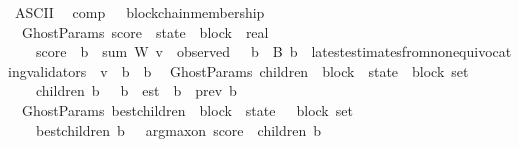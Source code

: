 \begin{isabellebody}
\isanewline
{}\isamarkupfalse%
\ {\isacharparenleft}ASCII{\isacharparenright}\isanewline
\ \ comp\ \ {\isacharparenleft}\ {\isachardoublequoteopen}blockchain{\isacharunderscore}membership{\isachardoublequoteclose}\ {}{}{\isacharparenright}\isanewline
\isanewline
\isanewline
{}\isamarkupfalse%
\ {\isacharparenleft}\ GhostParams{\isacharparenright}\ score\ {\isacharcolon}{\isacharcolon}\ {\isachardoublequoteopen}state\ {\isasymRightarrow}\ block\ {\isasymRightarrow}\ real{\isachardoublequoteclose}\isanewline
\ \ \isanewline
\ \ \ \ {\isachardoublequoteopen}score\ {\isasymsigma}\ b\ {\isacharequal}\ sum\ W\ {\isacharbraceleft}v\ {\isasymin}\ observed\ {\isasymsigma}{\isachardot}\ {\isasymexists}\ b{\isacharprime}\ {\isasymin}\ B{\isachardot}\ b{\isacharprime}\ {\isasymin}\ {\isacharparenleft}latest{\isacharunderscore}estimates{\isacharunderscore}from{\isacharunderscore}non{\isacharunderscore}equivocating{\isacharunderscore}validators\ {\isasymsigma}\ v{\isacharparenright}\ {\isasymand}\ {\isacharparenleft}b\ {\isasymdownharpoonright}\ b{\isacharprime}{\isacharparenright}{\isacharbraceright}{\isachardoublequoteclose}\isanewline
\isanewline
\isanewline
{}\isamarkupfalse%
\ {\isacharparenleft}\ GhostParams{\isacharparenright}\ children\ {\isacharcolon}{\isacharcolon}\ {\isachardoublequoteopen}block\ {\isacharasterisk}\ state\ {\isasymRightarrow}\ block\ set{\isachardoublequoteclose}\isanewline
\ \ \isanewline
\ \ \ \ {\isachardoublequoteopen}children\ {\isacharparenleft}b{\isacharcomma}\ {\isasymsigma}{\isacharparenright}\ {\isacharequal}\ {\isacharbraceleft}b{\isacharprime}\ {\isasymin}\ est\ {\isacharbackquote}{\isasymsigma}{\isachardot}\ b\ {\isacharequal}\ prev\ b{\isacharprime}{\isacharbraceright}{\isachardoublequoteclose}\isanewline
\isanewline
\isanewline
{}\isamarkupfalse%
\ {\isacharparenleft}\ GhostParams{\isacharparenright}\ best{\isacharunderscore}children\ {\isacharcolon}{\isacharcolon}\ {\isachardoublequoteopen}block\ {\isacharasterisk}\ state\ {\isasymRightarrow}\ \ block\ set{\isachardoublequoteclose}\isanewline
\ \ \isanewline
\ \ \ \ {\isachardoublequoteopen}best{\isacharunderscore}children\ {\isacharparenleft}b{\isacharcomma}\ {\isasymsigma}{\isacharparenright}\ {\isacharequal}\ {\isacharbraceleft}arg{\isacharunderscore}max{\isacharunderscore}on\ {\isacharparenleft}score\ {\isasymsigma}{\isacharparenright}\ {\isacharparenleft}children\ {\isacharparenleft}b{\isacharcomma}\ {\isasymsigma}{\isacharparenright}{\isacharparenright}{\isacharbraceright}{\isachardoublequoteclose}\isanewline

\end{isabellebody}
